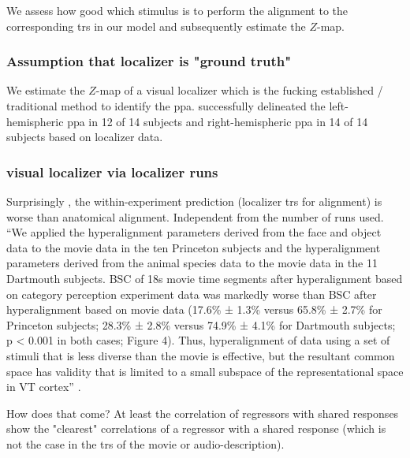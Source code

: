 We assess how good which stimulus is to perform the alignment to the
corresponding \acp{tr} in our model and subsequently estimate the $Z$-map.


\subsubsection{Assumption that localizer is "ground truth"}

We estimate the $Z$-map of a visual localizer which is the fucking established /
traditional method to identify the \ac{ppa}.
%
\citet{sengupta2016extension} successfully delineated the left-hemispheric
\ac{ppa} in 12 of 14 subjects and right-hemispheric \ac{ppa} in 14 of 14
subjects based on localizer data.


\subsubsection{visual localizer via localizer runs}


Surprisingly \citep[cf.][]{haxby2011common}, the within-experiment prediction
(localizer \acp{tr} for alignment) is worse than anatomical alignment.
%
Independent from the number of runs used.
%
``We applied the hyperalignment parameters derived from the face and object data
to the movie data in the ten Princeton subjects and the hyperalignment
parameters derived from the animal species data to the movie data in the 11
Dartmouth subjects.
%
BSC of 18s movie time segments after hyperalignment based on category perception
experiment data was markedly worse than BSC after hyperalignment based on movie
data (17.6\% ± 1.3\% versus 65.8\% ± 2.7\% for Princeton subjects; 28.3\% ±
2.8\% versus 74.9\% ± 4.1\% for Dartmouth subjects; p < 0.001 in both cases;
Figure 4).
%
Thus, hyperalignment of data using a set of stimuli that is less diverse than
the movie is effective, but the resultant common space has validity that is
limited to a small subspace of the representational space in VT cortex''
\citep{haxby2011common}.

How does that come? At least the correlation of regressors with shared responses
show the "clearest" correlations of a regressor with a shared response (which is
not the case in the \acp{tr} of the movie or audio-description).


